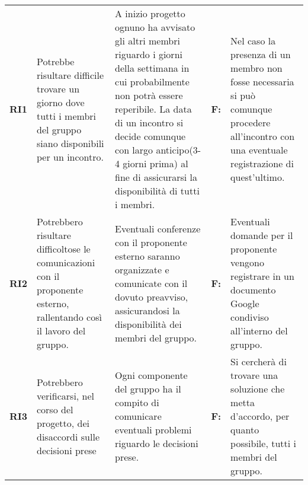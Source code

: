 {\begin{longtable}{C{2.5cm} C{3.25cm} C{3.25cm} C{1.5cm} C{3cm}}
\textbf{RI1} & 
Potrebbe risultare difficile trovare un giorno dove tutti i membri del gruppo siano disponibili per un incontro. & 
A inizio progetto ognuno ha avvisato gli altri membri riguardo i giorni della settimana in cui probabilmente non potrà essere reperibile. La data di un incontro si decide comunque con largo anticipo(3-4 giorni prima) al fine di assicurarsi la disponibilità di tutti i membri. &
\textbf{F:}  &
Nel caso la presenza di un membro non fosse necessaria si può comunque procedere all'incontro con una eventuale registrazione di quest'ultimo.\\

\textbf{RI2} & 
Potrebbero risultare difficoltose le comunicazioni con il proponente esterno, rallentando così il lavoro del gruppo. & 
Eventuali conferenze con il proponente esterno saranno organizzate e comunicate con il dovuto preavviso, assicurandosi la disponibilità dei membri del gruppo. &
\textbf{F:}  &
Eventuali domande per il proponente vengono registrare in un documento Google condiviso all'interno del gruppo. \\

\textbf{RI3} & 
Potrebbero verificarsi, nel corso del progetto, dei disaccordi sulle decisioni prese & 
Ogni componente del gruppo ha il compito di comunicare eventuali problemi riguardo le decisioni prese. &
\textbf{F:}  &
Si cercherà di trovare una soluzione che metta d'accordo, per quanto possibile, tutti i membri del gruppo. \\


\end{longtable}}
